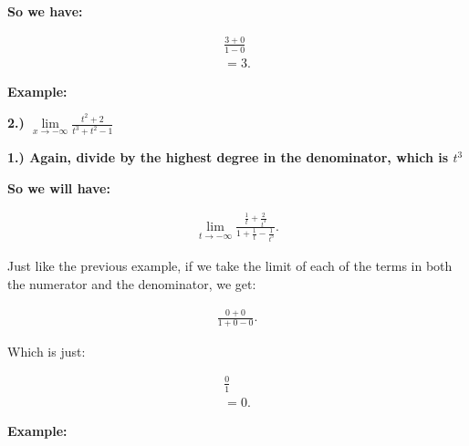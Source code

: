 \documentclass{report}
\begin{document}

        \bigbreak \noindent 
        \textbf{So we have:}

        \begin{align*}
            \frac{3+0}{1-0} \\ 
            = 3
        .\end{align*}

        \bigbreak \noindent \bigbreak \noindent \bigbreak \noindent 
        \begin{large}
            \textbf{Example:}
        \end{large}

        \bigbreak \noindent \bigbreak \noindent 
        \textbf{2.) $\lim\limits_{x \to - \infty}{ \frac{t^2 + 2}{t^3+t^2-1}}$}

        \bigbreak \noindent \bigbreak \noindent 
        \textbf{1.) Again, divide by the highest degree in the denominator, which is \textbf{\textit{$t^3$}}}

        \bigbreak \noindent 
        \textbf{So we will have:}

        \begin{align*}
            \lim\limits_{t \to - \infty}{\frac{ \frac{1}{t} + \frac{2}{t^3}}{ 1 + \frac{1}{t} - \frac{1}{t^3}}}
        .\end{align*}

        \bigbreak \noindent 
        Just like the previous example, if we take the limit of each of the terms in both the 
        numerator and the denominator, we get:

        \begin{align*}
            \frac{0 + 0}{1+0-0}
        .\end{align*}

        \bigbreak \noindent 
        Which is just:

        \begin{align*}
            \frac{0}{1} \\
            = 0
        .\end{align*}

        \bigbreak \noindent 

        \bigbreak \noindent \bigbreak \noindent 
        \begin{large}
            \textbf{Example:}
        \end{large}
\end{document}
